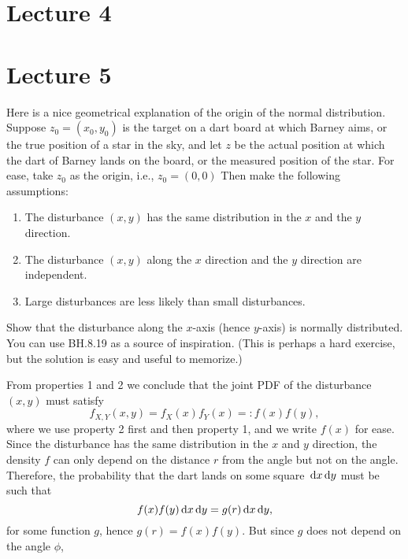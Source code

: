 \section{Lecture 4}

\section{Lecture 5}
\label{sec:lecture-5}

\begin{exercise}\label{ex:1}
Here is a nice geometrical explanation of the origin of the normal distribution.
Suppose $z_0=(x_0,y_{0})$ is the target on a dart board at which Barney aims, or the true position of a star in the sky, and let $z$ be the actual position at which the dart of Barney lands on the board, or the measured position of the star.
For ease, take $z_0$ as the origin, i.e., $z_0=(0,0)$ Then make the following assumptions:
\begin{enumerate}
\item The disturbance $(x,y)$ has the same distribution in the $x$ and the $y$ direction.
\item The disturbance $(x,y)$ along the $x$ direction and the $y$ direction are independent.
\item Large disturbances are less likely than small disturbances.
\end{enumerate}
Show that the disturbance along the $x$-axis (hence $y$-axis) is normally distributed. You can use BH.8.19 as a source of inspiration. (This is perhaps a hard exercise, but  the solution is easy and useful to memorize.)
\begin{solution}
From properties 1 and 2 we conclude that the joint PDF of the disturbance $(x,y)$ must satisfy
\begin{equation}
  \label{eq:1}
  f_{X,Y}(x,y) = f_X(x)f_Y(x) =: f(x)f(y),
\end{equation}
where we use property 2 first and then property 1, and we write $f(x)$ for ease.
Since the disturbance has the same distribution in the $x$ and $y$ direction, the density $f$ can only depend on the distance $r$ from the angle but not on the angle. Therefore, the probability that the dart lands on some square $\,\textrm{d}x\,\textrm{d}y$ must be such that
\begin{equation}
  \label{eq:4}
  f(x)f(y) \,\textrm{d}x \,\textrm{d}y = g(r) \,\textrm{d}x \,\textrm{d}y,
\end{equation}
for some function $g$, hence $g(r) = f(x)f(y)$. But since $g$ does not depend on the angle $\phi$,
\begin{equation}

\end{equation}
\end{solution}
\end{exercise}

